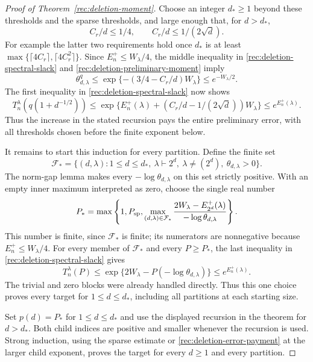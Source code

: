 \begin{proof}[Proof of Theorem~\ref{rec:deletion-moment}]
Choose an integer $d_*\ge1$ beyond these thresholds and the sparse
thresholds, and large enough that, for $d>d_*$,
\[
 C_r/d\le1/4,\qquad C_r/d\le1/(2\sqrt d).
\]
For example the latter two requirements hold once $d_*$ is at least
$\max\{\lceil4C_r\rceil,\lceil4C_r^2\rceil\}$.
Since $E_n^+\le W_\lambda/4$, the middle inequality in
\eqref{rec:deletion-spectral-slack} and
\eqref{rec:deletion-preliminary-moment} imply
\[
 \theta_{d,\lambda}^q
 \le\exp\{-(3/4-C_r/d)W_\lambda\}
 \le e^{-W_\lambda/2}.
\]
The first inequality in \eqref{rec:deletion-spectral-slack} now shows
\begin{equation}\label{rec:deletion-error-payment}
 T_n^\lambda(q(1+d^{-1/2}))
 \le\exp\{E_n^+(\lambda)
        +(C_r/d-1/(2\sqrt d))W_\lambda\}
 \le e^{E_n^+(\lambda)}.
\end{equation}
Thus the increase in the stated recursion pays the entire preliminary
error, with all thresholds chosen before the finite exponent below.

It remains to start this induction for every partition. Define the
finite set
\[
 \mathcal F_*=
 \{(d,\lambda):1\le d\le d_*,\ \lambda\vdash2^d,
    \ \lambda\ne(2^d),\ \theta_{d,\lambda}>0\}.
\]
The norm-gap lemma makes every $-\log\theta_{d,\lambda}$ on this
set strictly positive. With an empty inner maximum interpreted as
zero, choose the single real number
\begin{equation}\label{rec:deletion-finite-base}
 P_*=\max\left\{1,P_{\rm sp},
  \max_{(d,\lambda)\in\mathcal F_*}
   \frac{2W_\lambda-E_{2^d}^+(\lambda)}
        {-\log\theta_{d,\lambda}}\right\}.
\end{equation}
This number is finite, since $\mathcal F_*$ is finite; its numerators
are nonnegative because $E_n^+\le W_\lambda/4$.
For every member of $\mathcal F_*$ and every $P\ge P_*$, the last
inequality in \eqref{rec:deletion-spectral-slack} gives
\[
 T_n^\lambda(P)
 \le\exp\{2W_\lambda-P(-\log\theta_{d,\lambda})\}
 \le e^{E_n^+(\lambda)}.
\]
The trivial and zero blocks were already handled directly. Thus this
one choice proves every target for $1\le d\le d_*$, including all
partitions at each starting size.

Set $p(d)=P_*$ for $1\le d\le d_*$ and use the displayed recursion
in the theorem for $d>d_*$. Both child indices are positive and
smaller whenever the recursion is used. Strong induction, using the
sparse estimate or \eqref{rec:deletion-error-payment} at the larger child exponent, proves the target
for every $d\ge1$ and every partition.


\end{proof}
